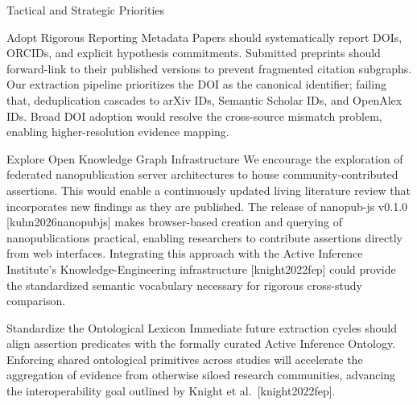 \documentclass[
  ignorenonframetext,
]{beamer}
\providecommand{\citep}[1]{[#1]}
\begin{document}
\begin{frame}[allowframebreaks]{Tactical and Strategic Priorities}
\protect{}\label{tactical-and-strategic-priorities}
\begin{block}{Adopt Rigorous Reporting Metadata}
\protect{}\label{adopt-rigorous-reporting-metadata}
Papers should systematically report DOIs, ORCIDs, and explicit
hypothesis commitments. Submitted preprints should forward-link to their
published versions to prevent fragmented citation subgraphs. Our
extraction pipeline prioritizes the DOI as the canonical identifier;
failing that, deduplication cascades to arXiv IDs, Semantic Scholar IDs,
and OpenAlex IDs. Broad DOI adoption would resolve the cross-source
mismatch problem, enabling higher-resolution evidence mapping.
\end{block}

\begin{block}{Explore Open Knowledge Graph Infrastructure}
\protect{}\label{explore-open-knowledge-graph-infrastructure}
We encourage the exploration of federated nanopublication server
architectures to house community-contributed assertions. This would
enable a continuously updated living literature review that incorporates
new findings as they are published. The release of nanopub-js v0.1.0
\citep{kuhn2026nanopubjs} makes browser-based creation and querying of
nanopublications practical, enabling researchers to contribute
assertions directly from web interfaces. Integrating this approach with
the Active Inference Institute's Knowledge-Engineering infrastructure
\citep{knight2022fep} could provide the standardized semantic vocabulary
necessary for rigorous cross-study comparison.
\end{block}

\begin{block}{Standardize the Ontological Lexicon}
\protect{}\label{standardize-the-ontological-lexicon}
Immediate future extraction cycles should align assertion predicates
with the formally curated Active Inference Ontology. Enforcing shared
ontological primitives across studies will accelerate the aggregation of
evidence from otherwise siloed research communities, advancing the
interoperability goal outlined by Knight et al.~\citep{knight2022fep}.
\end{block}
\end{frame}
\end{document}
